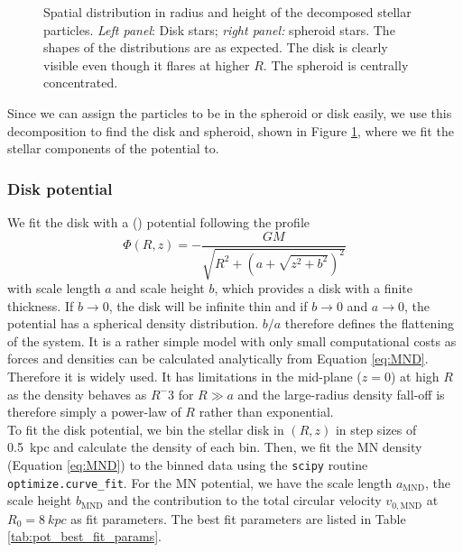 \begin{figure}[htbp]
\begin{subfigure}[c]{0.45\textwidth}
    \end{subfigure}
    \caption{Spatial distribution in radius and height of the decomposed stellar particles. \textit{Left panel}: Disk stars; \textit{right panel:} spheroid stars. The shapes of the distributions are as expected. The disk is clearly visible even though it flares at higher $R$. The spheroid is centrally concentrated.}
    \label{fig:disk_spheroid_dist}
\end{figure}
Since we can assign the particles to be in the spheroid or disk easily, we use this decomposition to find the disk and spheroid, shown in Figure \ref{fig:disk_spheroid_dist}, where we fit the stellar components of the potential to.

\subsubsection{Disk potential}\label{subsubsec:disk_pot}
We fit the disk with a \citet{MNprofile} () potential following the profile 
\begin{equation}\label{eq:MND}
\Phi(R,z) = -\frac{GM}{\sqrt{R^2+(a+\sqrt{z^2+b^2})^2}}
\end{equation} 
with scale length $a$ and scale height $b$, which provides a disk with a finite thickness. If $b\rightarrow 0$, the disk will be infinite thin and if $b\rightarrow 0$ and $a \rightarrow 0$, the potential has a spherical density distribution. $b/a$ therefore defines the flattening of the system. It is a rather simple model with only small computational costs as forces and densities can be calculated analytically from Equation \ref{eq:MND}. Therefore it is widely used. It has limitations in the mid-plane ($z=0$) at high $R$ as the density behaves as $R^−3$ for $R\gg a$ and the large-radius density fall-off is therefore simply a power-law of $R$ rather than exponential. 
\\To fit the disk potential, we bin the stellar disk in $(R, z)$ in step sizes of \SI{0.5}{kpc} and calculate the density of each bin. Then, we fit the \ac{MN} density (Equation \ref{eq:MND}) to the binned data using the \texttt{scipy} \citep{scipy....2001} routine \texttt{optimize.curve\_fit}. For the \ac{MN} potential, we have the scale length $a_{\mathrm{MND}}$, the scale height $b_{\mathrm{MND}}$ and the contribution to the total circular velocity $v_{0, \mathrm{MND}}$ at $ R_0 = \SI{8}{kpc}$ as fit parameters. The best fit parameters are listed in Table \ref{tab:pot_best_fit_params}.
